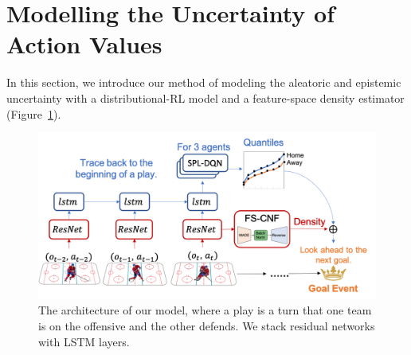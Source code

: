 \documentclass{article}
\begin{document}
\section{Modelling the Uncertainty of Action Values }\label{Sec:action-value-function}

In this section, we introduce our method of modeling the aleatoric and epistemic uncertainty with a distributional-RL model and a feature-space density estimator (Figure~\ref{fig:model-architecture}).

\begin{figure}[htbp]
    \vspace{-0.1in}
    \hspace{-0.1in}\includegraphics[scale=0.4]{figures/ice-hockey-net.png}
    \vspace{-0.3in}
    \caption{The architecture of our model, where a play is a turn that one team is on the offensive and the other defends. We stack residual networks with LSTM layers.
    }
    \label{fig:model-architecture}
    \vspace{-0.2in}
\end{figure}

\end{document}
